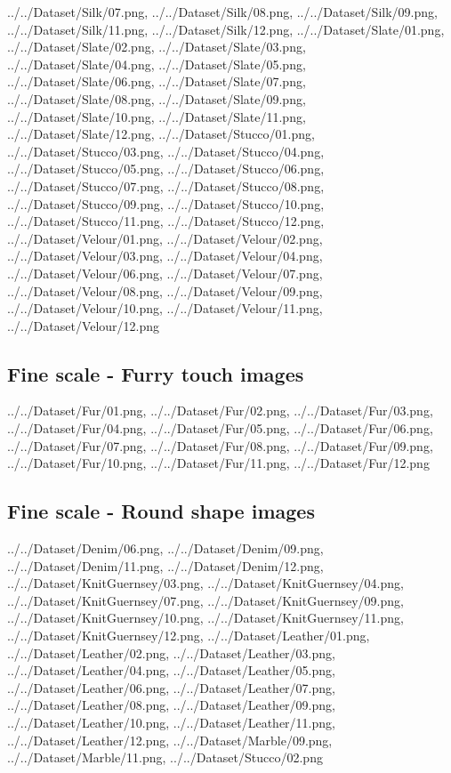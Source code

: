 {../../Dataset/Silk/07.png,
../../Dataset/Silk/08.png,
../../Dataset/Silk/09.png,
../../Dataset/Silk/11.png,
../../Dataset/Silk/12.png,
../../Dataset/Slate/01.png,
../../Dataset/Slate/02.png,
../../Dataset/Slate/03.png,
../../Dataset/Slate/04.png,
../../Dataset/Slate/05.png,
../../Dataset/Slate/06.png,
../../Dataset/Slate/07.png,
../../Dataset/Slate/08.png,
../../Dataset/Slate/09.png,
../../Dataset/Slate/10.png,
../../Dataset/Slate/11.png,
../../Dataset/Slate/12.png,
../../Dataset/Stucco/01.png,
../../Dataset/Stucco/03.png,
../../Dataset/Stucco/04.png,
../../Dataset/Stucco/05.png,
../../Dataset/Stucco/06.png,
../../Dataset/Stucco/07.png,
../../Dataset/Stucco/08.png,
../../Dataset/Stucco/09.png,
../../Dataset/Stucco/10.png,
../../Dataset/Stucco/11.png,
../../Dataset/Stucco/12.png,
../../Dataset/Velour/01.png,
../../Dataset/Velour/02.png,
../../Dataset/Velour/03.png,
../../Dataset/Velour/04.png,
../../Dataset/Velour/06.png,
../../Dataset/Velour/07.png,
../../Dataset/Velour/08.png,
../../Dataset/Velour/09.png,
../../Dataset/Velour/10.png,
../../Dataset/Velour/11.png,
../../Dataset/Velour/12.png}

\newpage
\subsection{Fine scale - Furry touch images}
{../../Dataset/Fur/01.png,
../../Dataset/Fur/02.png,
../../Dataset/Fur/03.png,
../../Dataset/Fur/04.png,
../../Dataset/Fur/05.png,
../../Dataset/Fur/06.png,
../../Dataset/Fur/07.png,
../../Dataset/Fur/08.png,
../../Dataset/Fur/09.png,
../../Dataset/Fur/10.png,
../../Dataset/Fur/11.png,
../../Dataset/Fur/12.png}

\newpage
\subsection{Fine scale - Round shape images}
{../../Dataset/Denim/06.png,
../../Dataset/Denim/09.png,
../../Dataset/Denim/11.png,
../../Dataset/Denim/12.png,
../../Dataset/KnitGuernsey/03.png,
../../Dataset/KnitGuernsey/04.png,
../../Dataset/KnitGuernsey/07.png,
../../Dataset/KnitGuernsey/09.png,
../../Dataset/KnitGuernsey/10.png,
../../Dataset/KnitGuernsey/11.png,
../../Dataset/KnitGuernsey/12.png,
../../Dataset/Leather/01.png,
../../Dataset/Leather/02.png,
../../Dataset/Leather/03.png,
../../Dataset/Leather/04.png,
../../Dataset/Leather/05.png,
../../Dataset/Leather/06.png,
../../Dataset/Leather/07.png,
../../Dataset/Leather/08.png,
../../Dataset/Leather/09.png,
../../Dataset/Leather/10.png,
../../Dataset/Leather/11.png,
../../Dataset/Leather/12.png,
../../Dataset/Marble/09.png,
../../Dataset/Marble/11.png,
../../Dataset/Stucco/02.png}

